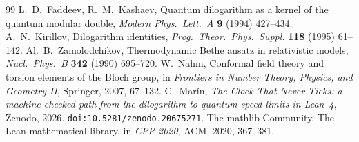 \documentclass[11pt]{article}
\begin{document}
\begin{thebibliography}{99}
 L.~D.~Faddeev, R.~M.~Kashaev, Quantum dilogarithm as a kernel of
the quantum modular double, \emph{Modern Phys.\ Lett.\ A} \textbf{9} (1994) 427--434.
 A.~N.~Kirillov, Dilogarithm identities, \emph{Prog.\ Theor.\ Phys.\
Suppl.} \textbf{118} (1995) 61--142.
 Al.~B.~Zamolodchikov, Thermodynamic Bethe ansatz in relativistic
models, \emph{Nucl.\ Phys.\ B} \textbf{342} (1990) 695--720.
 W.~Nahm, Conformal field theory and torsion elements of the Bloch group, in
\emph{Frontiers in Number Theory, Physics, and Geometry II}, Springer, 2007, 67--132.
\bibitem{clock} C.~Mar\'in, \emph{The Clock That Never Ticks: a machine-checked path from
the dilogarithm to quantum speed limits in Lean~4}, Zenodo, 2026.
\texttt{doi:10.5281/zenodo.20675271}.
 The mathlib Community, The Lean mathematical library, in \emph{CPP 2020},
ACM, 2020, 367--381.
\end{thebibliography}
\end{document}
